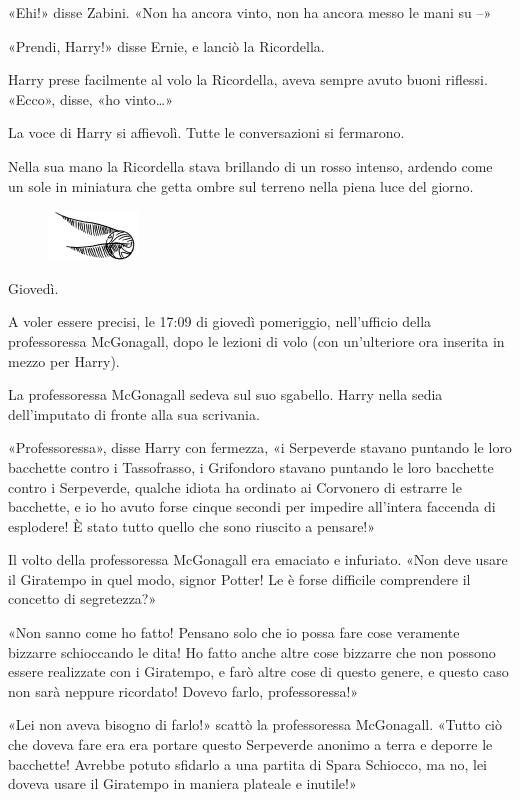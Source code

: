 «Ehi!» disse Zabini. «Non ha ancora vinto, non ha ancora messo le mani su –»

«Prendi, Harry!» disse Ernie, e lanciò la Ricordella.

Harry prese facilmente al volo la Ricordella, aveva sempre avuto buoni riflessi. «Ecco», disse, «ho vinto…»

La voce di Harry si affievolì. Tutte le conversazioni si fermarono.

Nella sua mano la Ricordella stava brillando di un rosso intenso, ardendo come un sole in miniatura che getta ombre sul terreno nella piena luce del giorno.

\begin{figure}[h!]
        \includegraphics[scale=0.4]{boccino.png}
        \centering
\end{figure}

Giovedì.

A voler essere precisi, le 17:09 di giovedì pomeriggio, nell’ufficio della professoressa McGonagall, dopo le lezioni di volo (con un’ulteriore ora inserita in mezzo per Harry).

La professoressa McGonagall sedeva sul suo sgabello. Harry nella sedia dell’imputato di fronte alla sua scrivania.

«Professoressa», disse Harry con fermezza, «i Serpeverde stavano puntando le loro bacchette contro i Tassofrasso, i Grifondoro stavano puntando le loro bacchette contro i Serpeverde, qualche idiota ha ordinato ai Corvonero di estrarre le bacchette, e io ho avuto forse cinque secondi per impedire all’intera faccenda di esplodere! È stato tutto quello che sono riuscito a pensare!»

Il volto della professoressa McGonagall era emaciato e infuriato. «Non deve usare il Giratempo in quel modo, signor Potter! Le è forse difficile comprendere il concetto di segretezza?»

«Non sanno come ho fatto! Pensano solo che io possa fare cose veramente bizzarre schioccando le dita! Ho fatto anche altre cose bizzarre che non possono essere realizzate con i Giratempo, e farò altre cose di questo genere, e questo caso non sarà neppure ricordato! Dovevo farlo, professoressa!»

«Lei non aveva bisogno di farlo!» scattò la professoressa McGonagall. «Tutto ciò che doveva fare era era portare questo Serpeverde anonimo a terra e deporre le bacchette! Avrebbe potuto sfidarlo a una partita di Spara Schiocco, ma no, lei doveva usare il Giratempo in maniera plateale e inutile!»

